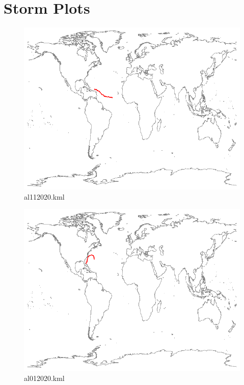\documentclass[]{article}
\begin{document}
\section{Storm Plots}
\begin{figure}[htbp]
    \centering
\includegraphics{al112020.png}
\caption{al112020.kml}
\label{fig:al112020}
\end{figure}

\begin{figure}[htbp]
    \centering
\includegraphics{al012020.png}
\caption{al012020.kml}
\label{fig:al012020}
\end{figure}
\end{document}
